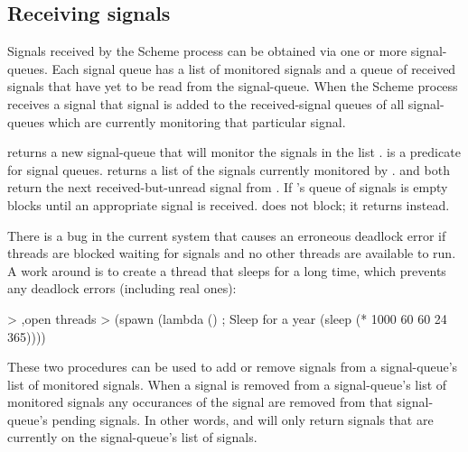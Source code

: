 \subsection{Receiving signals}

Signals received by the Scheme process can be obtained via one or more
 signal-queues.
Each signal queue has a list of monitored signals and a queue of
 received signals that have yet to be read from the signal-queue.
When the Scheme process receives a signal that signal is added to the
 received-signal queues of all signal-queues which are currently monitoring
 that particular signal.

\begin{protos}
\end{protos}
\noindent
{} returns a new signal-queue that will monitor
 the signals in the list .
 is a predicate for signal queues.
 returns a list of the signals
 currently monitored by .
 and  both return
 the next received-but-unread signal from .
If 's queue of signals is empty 
 blocks until an appropriate signal is received.
 does not block; it returns  instead.

There is a bug in the current system that causes an erroneous deadlock
 error if threads are blocked waiting for signals and no other threads
 are available to run.
A work around is to create a thread that sleeps for a long time, which
 prevents any deadlock errors (including real ones):
\begin{example}
> ,open threads
> (spawn (lambda ()
           ; Sleep for a year
           (sleep (* 1000 60 60 24 365))))
\end{example}

\begin{protos}
\end{protos}
\noindent
These two procedures can be used to add or remove signals from a
 signal-queue's list of monitored signals.
When a signal is removed from a signal-queue's list of monitored signals
 any occurances of the signal are removed from that signal-queue's pending
 signals.
In other words,  and 
 will only return signals that are currently on the signal-queue's list
 of signals.

